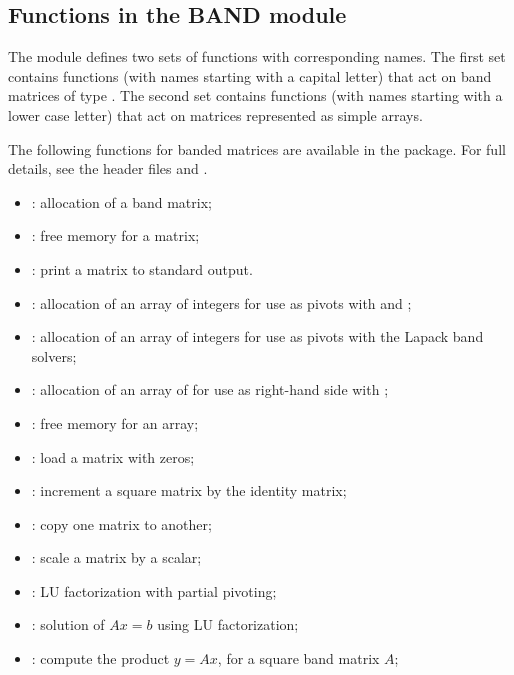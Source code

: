 \subsection{Functions in the BAND module}\label{ss:band}

The {\band} module defines two sets of functions with corresponding names.
The first set contains functions (with names starting with a capital letter)
that act on band matrices of type .  The second set contains functions
(with names starting with a lower case letter) that act on matrices represented 
as simple arrays.

The following functions for  banded matrices are available
in the {\band} package.  For full details, see the header files
 and .
\begin{itemize}
\item {}: allocation of a  band matrix;
\item {}: free memory for a  matrix;
\item {}: print a  matrix to standard output.
\item {}: allocation of an array of  integers for use
  as pivots with  and ;
\item {}: allocation of an array of  integers for use
  as pivots with the Lapack band solvers;
\item {}: allocation of an array of  for use
  as right-hand side with ;
\item {}: free memory for an array;
\item {}: load a matrix with zeros;
\item {}: increment a square matrix by the identity matrix;
\item {}: copy one matrix to another;
\item {}: scale a matrix by a scalar;
\item {}: LU factorization with partial pivoting;
\item {}: solution of $Ax = b$ using LU factorization;
\item {}: compute the product $y = Ax$, for a square band matrix $A$;
\end{itemize}

